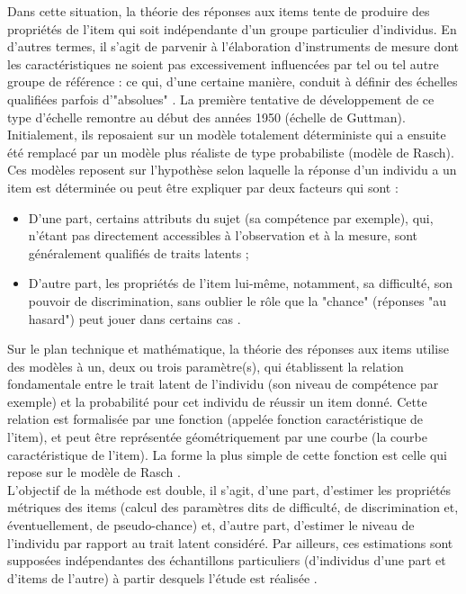 Dans cette situation, la théorie des réponses aux items tente de produire des propriétés de l’item qui soit indépendante d’un groupe particulier d’individus. En d'autres termes, il s'agit de parvenir à l'élaboration d'instruments de mesure dont les caractéristiques ne soient pas excessivement influencées par tel ou tel autre groupe de référence : ce qui, d'une certaine manière, conduit à définir des échelles qualifiées parfois d'"absolues" \cite{xcv_wiki}. La première tentative de développement de ce type d’échelle remontre au début des années 1950 (échelle de Guttman). Initialement, ils reposaient sur un modèle totalement déterministe qui a ensuite été remplacé par un modèle plus réaliste de type probabiliste (modèle de Rasch). Ces modèles reposent sur l’hypothèse selon laquelle la réponse d’un individu a un item est déterminée ou peut être expliquer par deux facteurs qui sont :

\begin{itemize}
	\item D’une part, certains attributs du sujet (sa compétence par exemple), qui, n'étant pas directement accessibles à l'observation et à la mesure, sont généralement qualifiés de traits latents \cite{xcv_wiki} ;
	\item D’autre part, les propriétés de l'item lui-même, notamment, sa difficulté, son pouvoir de discrimination, sans oublier le rôle que la "chance" (réponses "au hasard") peut jouer dans certains cas \cite{xcv_wiki}.
\end{itemize}

Sur le plan technique et mathématique, la théorie des réponses aux items utilise des modèles à un, deux ou trois paramètre(s), qui établissent la relation fondamentale entre le trait latent de l'individu (son niveau de compétence par exemple) et la probabilité pour cet individu de réussir un item donné. Cette relation est formalisée par une fonction (appelée fonction caractéristique de l'item), et peut être représentée géométriquement par une courbe (la courbe caractéristique de l'item). La forme la plus simple de cette fonction est celle qui repose sur le modèle de Rasch \cite{xcv_wiki}.\\
L'objectif de la méthode est double, il s'agit, d'une part, d'estimer les propriétés métriques des items (calcul des paramètres dits de difficulté, de discrimination et, éventuellement, de pseudo-chance) et, d'autre part, d'estimer le niveau de l'individu par rapport au trait latent considéré. Par ailleurs, ces estimations sont supposées indépendantes des échantillons particuliers (d'individus d'une part et d'items de l'autre) à partir desquels l'étude est réalisée \cite{xcv_wiki}.

